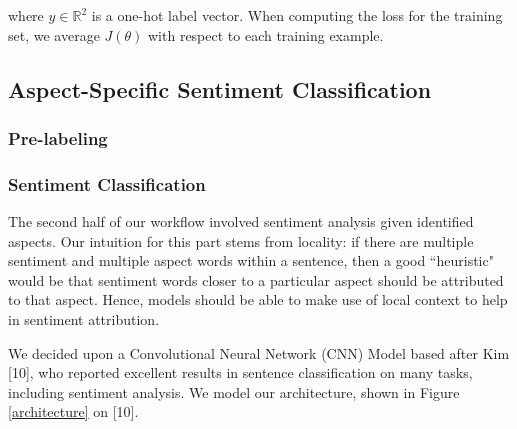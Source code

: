 \documentclass{article} %
\begin{document}
where $y \in \mathbb{R}^2$ is a one-hot label vector. When computing the loss for the training set, we average $J(\theta)$ with respect to each training example.

\subsection{Aspect-Specific Sentiment Classification}
\subsubsection{Pre-labeling}

\subsubsection{Sentiment Classification}

The second half of our workflow involved sentiment analysis given identified aspects. Our intuition for this part stems from locality: if there are multiple sentiment and multiple aspect words within a sentence, then a good ``heuristic" would be that sentiment words closer to a particular aspect should be attributed to that aspect. Hence, models should be able to make use of local context to help in sentiment attribution.

We decided upon a Convolutional Neural Network (CNN) Model based after Kim [10], who reported excellent results in sentence classification on many tasks, including sentiment analysis. We model our architecture, shown in Figure \ref{architecture} on [10].




\end{document}
